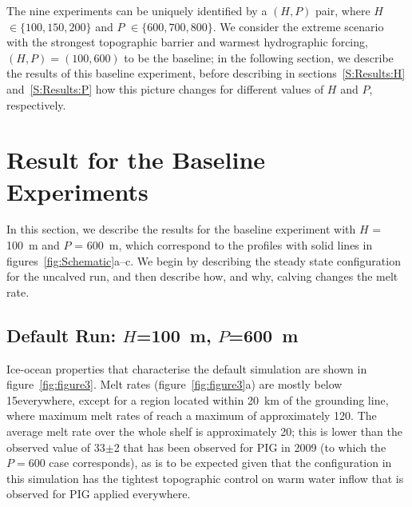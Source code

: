 \documentclass[draft]{agujournal2019}
\begin{document}
The nine experiments can be uniquely identified by a $(H,P)$ pair, where $H$ $\in \{100, 150, 200\}$ and $P$ $\in \{600, 700, 800\}$. We consider the extreme scenario with the strongest topographic barrier and warmest hydrographic forcing, $(H,P) = (100,600)$ to be the baseline; in the following section, we describe the results of this baseline experiment, before describing in sections~\ref{S:Results:H} and~\ref{S:Results:P} how this picture changes for different values of $H$ and $P$, respectively.

\section{Result for the Baseline Experiments}\label{S:Baseline}
In this section, we describe the results for the baseline experiment with $H$ = 100~m and $P$ = 600~m, which correspond to the profiles with solid lines in figures~\ref{fig:Schematic}a--c. We begin by describing the steady state configuration for the uncalved run, and then describe how, and why, calving changes the melt rate.

\subsection{Default Run: $H$=100~m, $P$=600~m}
Ice-ocean properties that characterise the default simulation are shown in figure~\ref{fig:figure3}. Melt rates (figure~\ref{fig:figure3}a) are mostly below  15\mpryr everywhere, except for a region located within 20~km of the grounding line, where maximum melt rates of reach a maximum of approximately 120\mpryr. The average melt rate over the whole shelf is approximately 20\mpryr; this is lower than the observed value of 33$\pm$2 that has been observed for PIG in 2009 (to which the $P=600$ case corresponds), as is to be expected given that the configuration in this simulation has the tightest topographic control on warm water inflow that is observed for PIG applied everywhere.
\end{document}
